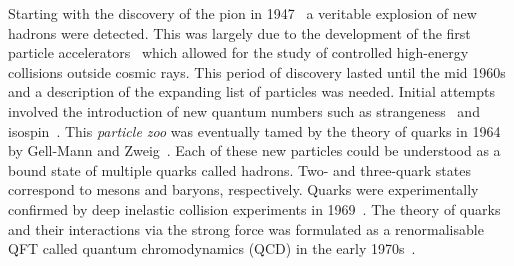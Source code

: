 Starting with the discovery of the pion in 1947~\cite{DiscoveryPimeson} a veritable explosion of new hadrons were detected.
This was largely due to the development of the first particle accelerators~\cite{ProductionHighSpeed} which allowed for the study of controlled high-energy collisions outside cosmic rays.
This period of discovery lasted until the mid 1960s and a description of the expanding list of particles was needed.
Initial attempts involved the introduction of new quantum numbers such as strangeness~\cite{Strange2, Strange3} and isospin~\cite{StrongIso1, StrongIso2, StrongIso3,StrongIso4}.
This \textit{particle zoo} was eventually tamed by the theory of quarks in 1964 by Gell-Mann and Zweig~\cite{GellMan1964,Zweig1964}.
Each of these new particles could be understood as a bound state of multiple quarks called hadrons.
Two- and three-quark states correspond to mesons and baryons, respectively.
Quarks were experimentally confirmed by deep inelastic collision experiments in 1969~\cite{Quark1, Quark2}.
The theory of quarks and their interactions via the strong force was formulated as a renormalisable QFT called quantum chromodynamics (QCD) in the early 1970s~\cite{QCD1,QCD2,QCD3}.

